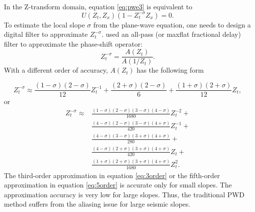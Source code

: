 In the Z-transform domain, equation \ref{eq:pwe3} is equivalent to 
 \begin{equation}
\label{eq:pwe4}
U(Z_t,Z_x)(1-Z_t^{-\sigma}Z_x) = 0.
\end{equation}
To estimate the local slope $\sigma$ from the plane-wave equation, one needs to design a digital filter to approximate $Z_t^{-\sigma}$. \cite{pwd} used an all-pass (or maxflat fractional delay) filter to approximate the phase-shift operator:
 \begin{equation}
\label{eq:pwe5}
Z_t^{-\sigma} = \frac{A(Z_t)}{A(1/Z_t)}. 
\end{equation}
With a different order of accuracy, $A(Z_t)$ has the following form

\begin{equation}
\label{eq:3order}
Z_t^{-\sigma} \approx \frac{(1-\sigma)(2-\sigma)}{12} Z_t^{-1} + \frac{(2+\sigma)(2-\sigma)}{6} +  \frac{(1+\sigma)(2+\sigma)}{12} Z_t, 
\end{equation}
or
\begin{equation}
\label{eq:5order}
\begin{split}
Z_t^{-\sigma} \approx &\frac{(1-\sigma)(2-\sigma)(3-\sigma)(4-\sigma)}{1680} Z_t^{-2} + \\
&\frac{(4-\sigma)(2-\sigma)(3-\sigma)(4+\sigma)}{420} Z_t^{-1}+ \\
&\frac{(4-\sigma)(3-\sigma)(3+\sigma)(4+\sigma)}{280} + \\
&\frac{(4-\sigma)(2+\sigma)(3+\sigma)(4+\sigma)}{420} Z_t + \\
&\frac{(1+\sigma)(2+\sigma)(3+\sigma)(4+\sigma)}{1680} Z_t^{2}. 
\end{split}
\end{equation}
The third-order approximation in equation \ref{eq:3order} or the fifth-order approximation in equation \ref{eq:5order} is accurate only for small slopes. The approximation accuracy is very low for large slopes. Thus, the traditional PWD method suffers from the aliasing issue for large seismic slopes.

